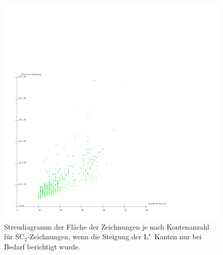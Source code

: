 \documentclass[a4paper]{scrreprt}
\theoremstyle{definition}
\begin{document}
\begin{figure}[p]
  \centering
  \includegraphics[width=\textwidth]{plots/smooth-opti}
  \caption{Streudiagramm der Fläche der Zeichnungen je nach Kontenanzahl für SC$_2$-Zeichnungen, wenn die Steigung der L"~Kanten nur bei Bedarf berichtigt wurde.}
  \label{fig:smooth-opti}
\end{figure}
\end{document}
